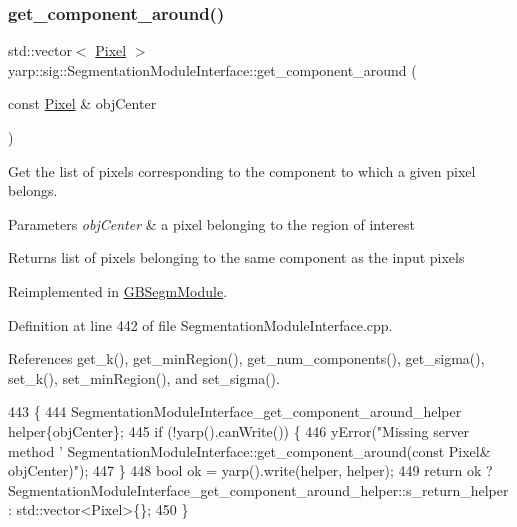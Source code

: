 \subsubsection{\texorpdfstring{get\+\_\+component\+\_\+around()}{get\_component\_around()}}
{\footnotesize\ttfamily std\+::vector$<$ \hyperlink{classyarp_1_1sig_1_1Pixel}{Pixel} $>$ yarp\+::sig\+::\+Segmentation\+Module\+Interface\+::get\+\_\+component\+\_\+around (\begin{DoxyParamCaption}\item[{const \hyperlink{classyarp_1_1sig_1_1Pixel}{Pixel} \&}]{obj\+Center }\end{DoxyParamCaption})\hspace{0.3cm}{\ttfamily [virtual]}}



Get the list of pixels corresponding to the component to which a given pixel belongs. 


\begin{DoxyParams}{Parameters}
{\em obj\+Center} & a pixel belonging to the region of interest \\
\hline
\end{DoxyParams}
\begin{DoxyReturn}{Returns}
list of pixels belonging to the same component as the input pixels 
\end{DoxyReturn}


Reimplemented in \hyperlink{classGBSegmModule_a0b63c53513e67c4f126e29cf7f28ad53}{G\+B\+Segm\+Module}.



Definition at line 442 of file Segmentation\+Module\+Interface.\+cpp.



References get\+\_\+k(), get\+\_\+min\+Region(), get\+\_\+num\+\_\+components(), get\+\_\+sigma(), set\+\_\+k(), set\+\_\+min\+Region(), and set\+\_\+sigma().


\begin{DoxyCode}
443 \{
444     SegmentationModuleInterface\_get\_component\_around\_helper helper\{objCenter\};
445     \textcolor{keywordflow}{if} (!yarp().canWrite()) \{
446         yError(\textcolor{stringliteral}{"Missing server method '%
       SegmentationModuleInterface::get\_component\_around(const Pixel& objCenter)"});
447     \}
448     \textcolor{keywordtype}{bool} ok = yarp().write(helper, helper);
449     \textcolor{keywordflow}{return} ok ? SegmentationModuleInterface\_get\_component\_around\_helper::s\_return\_helper : 
      std::vector<Pixel>\{\};
450 \}
\end{DoxyCode}
\mbox{\label{classyarp_1_1sig_1_1SegmentationModuleInterface_a91f3d872a48599337d1d2f365ac4c31e}} 
